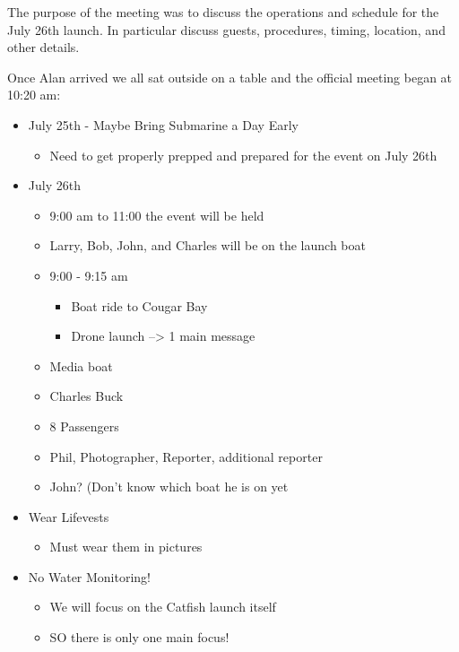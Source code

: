 \documentclass[12pt]{article}
\begin{document}
			\noindent
			The purpose of the meeting was to discuss the operations and schedule for the July 26th launch. In particular discuss guests, procedures, timing, location, and other details.
			
			\noindent
			 Once Alan arrived we all sat outside on a table and the official meeting began at 10:20 am:
			
			\noindent
			\begin{itemize}
				\item July 25th - Maybe Bring Submarine a Day Early
				\begin{itemize}
					\item Need to get properly prepped and prepared for the event on July 26th
				\end{itemize}
				\item July 26th
				\begin{itemize}
					\item 9:00 am to 11:00 the event will be held
					\item Larry, Bob, John, and Charles will be on the launch boat
					\item 9:00 - 9:15 am
					\begin{itemize}
						\item Boat ride to Cougar Bay
						\item Drone launch --> 1 main message
					\end{itemize}
					\item Media boat
					\item Charles Buck
					\item 8 Passengers 
					\item Phil, Photographer, Reporter, additional reporter
					\item John? (Don't know which boat he is on yet
				\end{itemize}
				\item Wear Lifevests
				\begin{itemize}
					\item Must wear them in pictures
				\end{itemize}
				\item No Water Monitoring!
				\begin{itemize}
					\item We will focus on the Catfish launch itself
					\item SO there is only one main focus!
				\end{itemize}
			\end{itemize}
			
\end{document}
